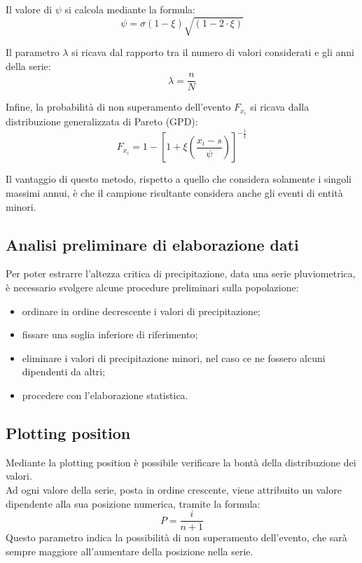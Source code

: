 \noindent Il valore di $\psi$ si calcola mediante la formula:
\begin{equation}
    \psi = \sigma(1-\xi) \sqrt{(1-2 \cdot \xi)}
\end{equation}

\noindent Il parametro $\lambda$ si ricava dal rapporto tra il numero di valori considerati e gli anni della serie:
\begin{equation}
    \lambda = \frac{n}{N}
\end{equation}

\noindent Infine, la probabilità di non superamento dell'evento $F_{x_i}$ si ricava dalla distribuzione generalizzata di Pareto (GPD):
\begin{equation}
F_{x_i} = 1- \left[ 1+\xi\left(\frac{x_i - s}{\psi}\right)\right]^{-\frac{1}{\xi}}
\label{prob_non_super_pareto}
\end{equation}

\noindent Il vantaggio di questo metodo, rispetto a quello che considera solamente i singoli massimi annui, è che il campione risultante considera anche gli eventi di entità minori.

\subsection{Analisi preliminare di elaborazione dati}
Per poter estrarre l'altezza critica di precipitazione, data una serie pluviometrica, è necessario svolgere alcune procedure preliminari sulla popolazione:
\begin{itemize}
    \item ordinare in ordine decrescente i valori di precipitazione;
    \item fissare una soglia inferiore di riferimento;
    \item eliminare i valori di precipitazione minori, nel caso ce ne fossero alcuni dipendenti da altri;
    \item procedere con l'elaborazione statistica.
\end{itemize}

\subsection{Plotting position}
Mediante la plotting position è possibile verificare la bontà della distribuzione dei valori.\\
Ad ogni valore della serie, posta in ordine crescente, viene attribuito un valore dipendente alla sua posizione numerica, tramite la formula:
\begin{equation}
   P= \frac{i}{n+1}
\end{equation}
Questo parametro indica la possibilità di non superamento dell'evento, che sarà sempre maggiore all'aumentare della posizione nella serie.

